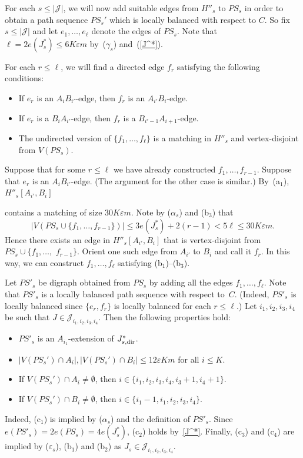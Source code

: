 \documentclass{memo-l}
\def\COMMENT#1{}
\def\eps{\varepsilon}
\def\I{i_1,i_2,i_3,i_4}
\numberwithin{section}{chapter}
\numberwithin{equation}{section}
\numberwithin{firstthm}{section}
\numberwithin{figure}{section}
\begin{document}
{For each $s\le |\mathcal{J} |$, we will now add suitable edges from $H''_s$ to $PS_s$ in order to obtain a path sequence $PS_s'$ which
is locally balanced with respect to $C$. So fix $s \le |\mathcal{J}|$ and let $e_1, \dots, e_{\ell}$ denote the edges of $PS_s$.
Note that $\ell = 2e(J^*_s) \le 6 K \eps m $ by~($\gamma_s$) and~(\ref{J^*}).%
    \COMMENT{Deryk: had $\ell = 2e(J^*_s) \le 2 \eps n \le 6 K \eps m $}
For each $r \le \ell$, we will find a directed edge $f_r$ satisfying the following conditions: 
\begin{itemize}
	\item[\rm (b$_1$)] If $e_r$ is an $A_i B_{i'} $-edge, then $f_r$ is an $A_{i'}B_{i}$-edge.
	\item[\rm (b$_2$)] If $e_r$ is a $B_i A_{i'} $-edge, then $f_r$ is a $B_{i'-1}A_{i+1}$-edge.
	\item[\rm (b$_3$)] The undirected version of $\{f_1, \dots, f_{\ell}\}$ is a matching in $H''_s$ and vertex-disjoint from $V(PS_s)$.
\end{itemize}
Suppose that for some $r \le \ell$ we have already constructed $f_1, \dots, f_{r-1}$.
Suppose that $e_r$ is an $A_i B_{i'} $-edge. (The argument for the other case is similar.) 
By~(a$_1$), $H''_s[A_{i'},B_{i}]$%
    \COMMENT{Daniela: had $H''_s[A_i,B_{i'}]$}
contains a matching of size $30 K \eps m $.
Note by ($\alpha_s$) and (b$_3$) that 
$$ |V(PS_s \cup \{f_1, \dots, f_{r-1} \})| \le 3 e(J^*_s) + 2(r-1) < 5 \ell \le 30 K \eps m. $$
Hence there exists an edge in $H''_s[A_{i'},B_{i}]$ that is vertex-disjoint from $PS_s \cup \{f_1, \dots,$ $ f_{r-1} \} $.
Orient one such edge from $A_{i'}$ to $B_{i}$ and call it $f_r$.
In this way, we can construct $f_1, \dots, f_{\ell}$ satisfying (b$_1$)--(b$_3$).

Let $PS'_s$ be digraph obtained from $PS_s$ by adding all the edges $f_1, \dots, f_{\ell}$.
Note that $PS'_s$ is a locally balanced path sequence with respect to~$C$.
(Indeed, $PS'_s$ is locally balanced since $\{e_r,f_r\}$ is locally balanced for each $r \le \ell$.)
Let $\I$ be such that $J\in\mathcal{J}_{\I}$. Then the following properties hold:
\begin{itemize}
	\item[(c$_1$)] $PS'_s$ is an $A_{i_1}$-extension of $J^*_{s,{\rm dir}}$.
	\item[(c$_2$)] $|V(PS_s') \cap A_i| , |V(PS_s') \cap B_i| \le 12 \eps K m$ for all $i\le K$.	
	\item[(c$_3$)] If $V(PS_s') \cap A_i \ne \emptyset$, then $i \in \{ \I, i_3+1 ,i_4+1 \}$.
	\item[(c$_4$)] If $V(PS_s') \cap B_i \ne \emptyset$, then $i \in \{ i_1-1, \I\}$.
\end{itemize}
Indeed, (c$_1$) is implied by ($\alpha_s$) and the definition of $PS'_s$.
Since $e(PS'_s) = 2 e(PS_s) = 4 e(J^*_s)$, (c$_2$) holds by~\eqref{J^*}.
Finally, (c$_3$) and (c$_4$) are implied by ($\eps_s$), (b$_1$) and (b$_2$) as $J_s \in \mathcal{J}_{\I}$.
 
}
\end{document}
